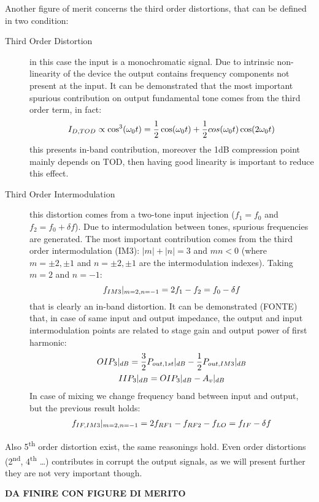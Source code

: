 Another figure of merit concerns the third order distortions, that can be defined in two condition:
\begin{description}
	\item [Third Order Distortion] in this case the input is a monochromatic signal. Due to intrinsic non-linearity of the device the output contains frequency components not present at the input. It can be demonstrated that the most important spurious contribution on output fundamental tone comes from the third order term, in fact:
	\begin{equation}
	I_{D,TOD} \propto \cos^3(\omega_0 t) = \frac{1}{2}\cos(\omega_0 t)+\frac{1}{2}cos(\omega_0 t)\cos(2\omega_0 t) \notag
	\end{equation} 
	this presents in-band contribution, moreover the 1dB compression point mainly depends on TOD, then having good linearity is important to reduce this effect.
	
	\item [Third Order Intermodulation] this distortion comes from a two-tone input injection ($f_1 = f_0$ and $f_2=f_0+\delta f$). Due to intermodulation between tones, spurious frequencies are generated. The most important contribution comes from the third order intermodulation (IM3): $|m|+|n|=3$ and $mn<0$ (where $m=\pm2,\pm1$ and $n=\pm2,\pm1$ are the intermodulation indexes). Taking $m=2$ and $n=-1$:
	\begin{equation}
		f_{IM3}|_{m=2,n=-1} = 2f_1-f_2 = f_0 - \delta f \notag
	\end{equation}
	that is clearly an in-band distortion.
	It can be demonstrated (FONTE) that, in case of same input and output impedance, the output and input intermodulation points are related to stage gain and output power of first harmonic:
	\begin{gather}
	OIP_3|_{dB} = \frac{3}{2}P_{out,1st}|_{dB}-\frac{1}{2}P_{out,IM3}|_{dB} \notag \\
	IIP_3|_{dB} = OIP_3|_{dB}-A_v|_{dB} \notag
	\end{gather} 
	In case of mixing we change frequency band between input and output, but the previous result holds:
	\begin{gather}
			f_{IF,IM3}|_{m=2,n=-1} = 2f_{RF1} - f_{RF2} -f_{LO}= f_{IF} - \delta f \notag
	\end{gather}
\end{description}

Also 5\textsuperscript{th} order distortion exist, the same reasonings hold. Even order distortions (2\textsuperscript{nd}, 4\textsuperscript{th} \dots) contributes in corrupt the output signals, as we will present further they are not very important though.

\textbf{DA FINIRE CON FIGURE DI MERITO}